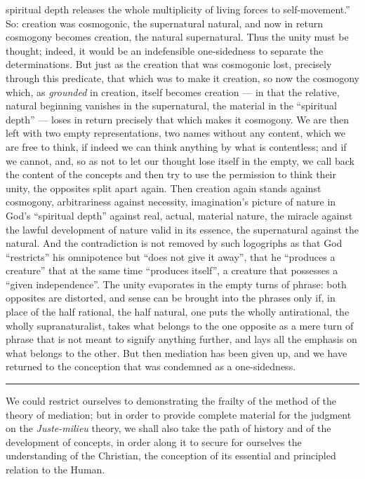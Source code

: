 \documentclass[12pt,a4paper,openany]{book}
\newcommand{\opage}[1]{\marginnote{\footnotesize\textit{[#1]}}}
\begin{document}
spiritual depth releases the whole multiplicity of living forces
to self-movement.'' So: creation was cosmogonic,
the supernatural natural, and now in return
cosmogony becomes creation, the natural supernatural. Thus
the unity must be thought; indeed, it would be an indefensible
one-sidedness to separate the determinations. But just as the
creation that was cosmogonic lost, precisely through this predicate,
that which was to make it creation, so now the
cosmogony which, as \emph{grounded} in creation, itself becomes
creation --- in that the relative, natural beginning vanishes
in the supernatural, the material in the ``spiritual depth'' --- loses in
\opage{442}return precisely that which makes it cosmogony. We are
then left with two empty representations, two names without any content,
which we are free to think, if indeed we can
think anything by what is contentless; and if we cannot,
and, so as not to let our thought lose itself in the empty, we call
back the content of the concepts and then try to use the permission
to think their unity, the opposites split
apart again. Then creation again stands against cosmogony, arbitrariness
against necessity, imagination's picture of nature
in God's ``spiritual depth'' against real, actual, material
nature, the miracle against the lawful
development of nature valid in its essence, the supernatural against the natural. And the contradiction
is not removed by such logogriphs as that God
``restricts'' his omnipotence but ``does not give it away'', that he
``produces a creature'' that at the same time ``produces itself'',
a creature that possesses a ``given independence''. The unity
evaporates in the empty turns of phrase: both opposites
are distorted, and sense can be brought into the phrases only
if, in place of the half rational, the half
natural, one puts the wholly antirational, the wholly supranaturalist,
takes what belongs to the one opposite
as a mere turn of phrase that is not meant to signify anything further, and lays
all the emphasis on what belongs to the other. But then
mediation has been given up, and we have returned to the conception
that was condemned as a one-sidedness.

\begin{center}\rule{1.8cm}{0.4pt}\end{center}

We could restrict ourselves to demonstrating the frailty of
the method of the theory of mediation; but in order to provide complete
material for the judgment on the \textit{Juste-milieu} theory, we
shall also take the path of history and of the development of concepts, in order along it
to secure for ourselves the understanding of the Christian, the conception of
its essential and principled relation to the Human.
\end{document}
